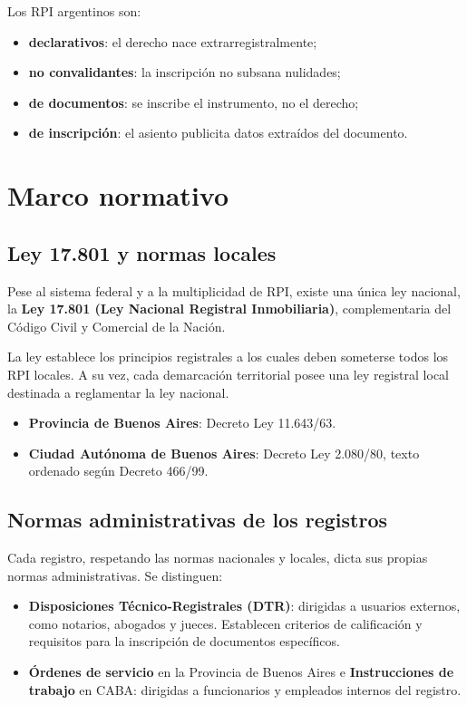\documentclass[12pt,oneside]{book}
\begin{document}
\begin{important}
Los RPI argentinos son:
\begin{itemize}
    \item \textbf{declarativos}: el derecho nace extrarregistralmente;
    \item \textbf{no convalidantes}: la inscripción no subsana nulidades;
    \item \textbf{de documentos}: se inscribe el instrumento, no el derecho;
    \item \textbf{de inscripción}: el asiento publicita datos extraídos del documento.
\end{itemize}
\end{important}

\chapter{Marco normativo}

\section{Ley 17.801 y normas locales}

Pese al sistema federal y a la multiplicidad de RPI, existe una única ley nacional, la \textbf{Ley 17.801 (Ley Nacional Registral Inmobiliaria)}, complementaria del Código Civil y Comercial de la Nación.

La ley establece los principios registrales a los cuales deben someterse todos los RPI locales. A su vez, cada demarcación territorial posee una ley registral local destinada a reglamentar la ley nacional.

\begin{itemize}
    \item \textbf{Provincia de Buenos Aires}: Decreto Ley 11.643/63.
    \item \textbf{Ciudad Autónoma de Buenos Aires}: Decreto Ley 2.080/80, texto ordenado según Decreto 466/99.
\end{itemize}

\section{Normas administrativas de los registros}

Cada registro, respetando las normas nacionales y locales, dicta sus propias normas administrativas. Se distinguen:

\begin{itemize}
    \item \textbf{Disposiciones Técnico-Registrales (DTR)}: dirigidas a usuarios externos, como notarios, abogados y jueces. Establecen criterios de calificación y requisitos para la inscripción de documentos específicos.
    \item \textbf{Órdenes de servicio} en la Provincia de Buenos Aires e \textbf{Instrucciones de trabajo} en CABA: dirigidas a funcionarios y empleados internos del registro.
\end{itemize}
\end{document}
